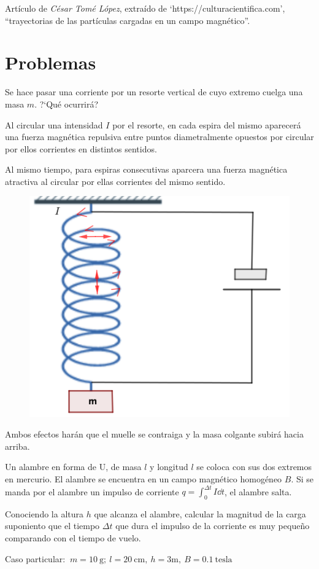 \footnotesize{Artículo de \emph{César Tomé López}, extraído de `https://culturacientifica.com',  ``trayectorias de las partículas cargadas en un campo magnético''}\normalsize{.}

\section{Problemas}
	
\vspace{10mm} %
\begin{prob}
Se hace pasar una corriente por un resorte vertical de cuyo extremo cuelga una masa $m$. ?`Qué ocurrirá?	
\end{prob}

\begin{multicols}{2}
Al circular una intensidad $I$ por el resorte, en cada espira del mismo aparecerá una fuerza magnética repulsiva entre puntos diametralmente opuestos por circular por ellos corrientes en distintos sentidos.

Al mismo tiempo, para espiras consecutivas aparcera una fuerza magnética atractiva al circular por ellas corrientes del mismo sentido.
\begin{figure}[H]
	\centering
	\includegraphics[width=.4\textwidth]{imagenes/imagenes26/T26IM20.png}
	\end{figure}	
\end{multicols}
\vspace{-3mm} Ambos efectos harán que el muelle se contraiga y la masa colgante subirá hacia arriba.


\vspace{10mm} %
\begin{prob}
Un alambre en forma de U, de masa $l$ y longitud $l$ se coloca con sus dos extremos en mercurio. El alambre se encuentra en un campo magnético homogéneo $B$. Si se 	manda por el alambre un impulso de corriente $\displaystyle q=\int_0^{\Delta t} I \dd t$, el alambre salta.

Conociendo la altura $h$ que alcanza el alambre, calcular la magnitud de la carga suponiento que el tiempo $\Delta t$ que dura el impulso de la corriente es muy pequeño comparando con el tiempo de vuelo.

Caso particular: $\ m=10\ \mathrm{g}; \ l=20 \ \mathrm{cm}, \ h=3 \mathrm{m},\ B=0.1 \ \mathrm{\text{tesla}}$ 
\end{prob}

